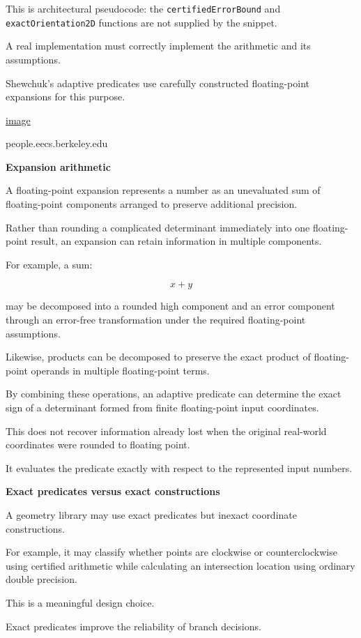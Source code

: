 This is architectural pseudocode: the \texttt{certifiedErrorBound} and \texttt{exactOrientation2D} functions are not supplied by the snippet.

A real implementation must correctly implement the arithmetic and its assumptions.

Shewchuk's adaptive predicates use carefully constructed floating-point expansions for this purpose. 

\href{https://www.google.com/s2/favicons?domain=https://people.eecs.berkeley.edu&sz=32}{image}

people.eecs.berkeley.edu

\textbf{Expansion arithmetic}

A floating-point expansion represents a number as an unevaluated sum of floating-point components arranged to preserve additional precision.

Rather than rounding a complicated determinant immediately into one floating-point result, an expansion can retain information in multiple components.

For example, a sum:

\[
x+y
\]

may be decomposed into a rounded high component and an error component through an error-free transformation under the required floating-point assumptions.

Likewise, products can be decomposed to preserve the exact product of floating-point operands in multiple floating-point terms.

By combining these operations, an adaptive predicate can determine the exact sign of a determinant formed from finite floating-point input coordinates.

This does not recover information already lost when the original real-world coordinates were rounded to floating point.

It evaluates the predicate exactly with respect to the represented input numbers.

\textbf{Exact predicates versus exact constructions}

A geometry library may use exact predicates but inexact coordinate constructions.

For example, it may classify whether points are clockwise or counterclockwise using certified arithmetic while calculating an intersection location using ordinary double precision.

This is a meaningful design choice.

Exact predicates improve the reliability of branch decisions.

